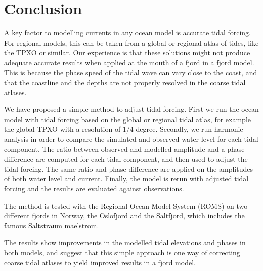 \section{Conclusion}

A key factor to modelling currents in any ocean model is accurate tidal forcing. For regional models, this can be taken from a global or regional atlas of tides, like the TPXO or similar. Our experience is that these solutions might not produce adequate accurate results when applied at the mouth of a fjord in a fjord model. This is because the phase speed of the tidal wave can vary close to the coast, and that the coastline and the depths are not properly resolved in the coarse tidal atlases.

We have proposed a simple method to adjust tidal forcing. First we run the ocean model with tidal forcing based on the global or regional tidal atlas, for example the global TPXO with a resolution of $1/4$ degree. Secondly, we run harmonic analysis in order to compare the simulated and observed water level for each tidal component. The ratio between observed and modelled amplitude and a phase difference are computed for each tidal component, and then used to adjust the tidal forcing. The same ratio and phase difference are applied on the amplitudes of both water level and current. Finally, the model is rerun with adjusted tidal forcing and the results are evaluated against observations.

The method is tested with the Regional Ocean Model System (ROMS) on two different fjords in Norway, the Oslofjord and the Saltfjord, which includes the famous Saltstraum maelstrom.
 
The results show improvements in the modelled tidal elevations and phases in both models, and suggest that this simple approach is one way of correcting coarse tidal atlases to yield improved results in a fjord model.
